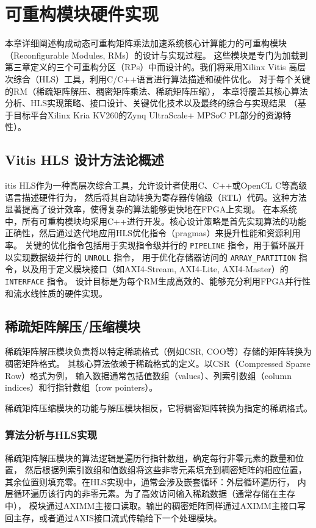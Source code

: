 \chapter{可重构模块硬件实现}

本章详细阐述构成动态可重构矩阵乘法加速系统核心计算能力的可重构模块（Reconfigurable Modules, RMs）的设计与实现过程。
这些模块是专门为加载到第三章定义的三个可重构分区（RPs）中而设计的。我们将采用Xilinx Vitis 高层次综合（HLS）工具，利用C/C++语言进行算法描述和硬件优化。
对于每个关键的RM（稀疏矩阵解压、稠密矩阵乘法、稀疏矩阵压缩），
本章将覆盖其核心算法分析、HLS实现策略、接口设计、关键优化技术以及最终的综合与实现结果
（基于目标平台Xilinx Kria KV260的Zynq UltraScale+ MPSoC PL部分的资源特性）。

\section{Vitis HLS 设计方法论概述}

itis HLS作为一种高层次综合工具，允许设计者使用C、C++或OpenCL C等高级语言描述硬件行为，
然后将其自动转换为寄存器传输级（RTL）代码。这种方法显著提高了设计效率，使得复杂的算法能够更快地在FPGA上实现。
在本系统中，所有可重构模块均采用C++进行开发。核心设计策略是首先实现算法的功能正确性，然后通过迭代地应用HLS优化指令（pragmas）来提升性能和资源利用率。
关键的优化指令包括用于实现指令级并行的 \verb|PIPELINE| 指令，用于循环展开以实现数据级并行的 \verb|UNROLL| 指令，
用于优化存储器访问的 \verb|ARRAY_PARTITION| 指令，以及用于定义模块接口（如AXI4-Stream, AXI4-Lite, AXI4-Master）的 \verb|INTERFACE| 指令。
设计目标是为每个RM生成高效的、能够充分利用FPGA并行性和流水线性质的硬件实现。

\section{稀疏矩阵解压/压缩模块}

稀疏矩阵解压模块负责将以特定稀疏格式（例如CSR, COO等）存储的矩阵转换为稠密矩阵格式。
其核心算法依赖于稀疏格式的定义。以CSR（Compressed Sparse Row）格式为例，
输入数据通常包括值数组（values）、列索引数组（column indices）和行指针数组（row pointers）。

稀疏矩阵压缩模块的功能与解压模块相反，它将稠密矩阵转换为指定的稀疏格式。

\subsection{算法分析与HLS实现}

稀疏矩阵解压模块的算法逻辑是遍历行指针数组，确定每行非零元素的数量和位置，
然后根据列索引数组和值数组将这些非零元素填充到稠密矩阵的相应位置，
其余位置则填充零。在HLS实现中，通常会涉及嵌套循环：外层循环遍历行，
内层循环遍历该行内的非零元素。为了高效访问输入稀疏数据（通常存储在主存中），
模块通过AXIMM主接口读取。输出的稠密矩阵同样通过AXIMM主接口写回主存，或者通过AXIS接口流式传输给下一个处理模块。

